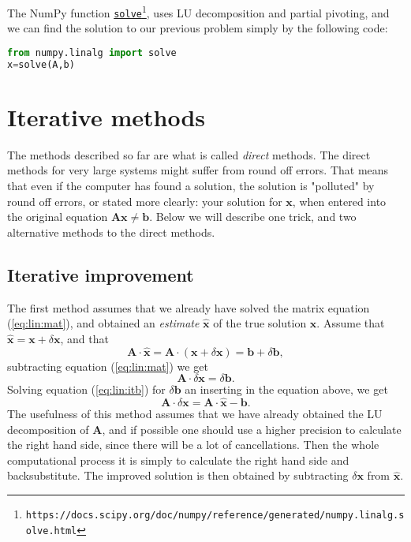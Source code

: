 \documentclass[graybox,sectrefs,envcountresetchap,open=right,final]{svmonodo}
\begin{document}
The NumPy function \href{{https://docs.scipy.org/doc/numpy/reference/generated/numpy.linalg.solve.html}}{\nolinkurl{solve}\footnote{\texttt{https://docs.scipy.org/doc/numpy/reference/generated/numpy.linalg.solve.html}}}, uses LU decomposition and partial pivoting, and we can find the solution to our previous problem simply by the following code:



\begin{lstlisting}[language=python,style=blue1]
from numpy.linalg import solve
x=solve(A,b)

\end{lstlisting}


\section{Iterative methods}
The methods described so far are what is called \emph{direct} methods. The direct methods for very large systems might suffer from round off errors. That means that even if the computer has found a solution, the solution is "polluted" by round off errors, or stated more clearly: your solution for $\mathbf{x}$, when entered into the original equation $\mathbf{A}\mathbf{x}\neq\mathbf{b}$. Below we will describe one trick, and two alternative methods to the direct methods.
\subsection{Iterative improvement}
The first method \cite{press2001} assumes that we already have solved the matrix equation (\ref{eq:lin:mat}), and obtained an \emph{estimate} $\mathbf{\hat{x}}$ of the true solution $\mathbf{x}$. Assume that $\mathbf{\hat{x}}=\mathbf{x}+\delta\mathbf{x}$, and that
\begin{equation}
\mathbf{A}\cdot\mathbf{\hat{x}}=\mathbf{A}\cdot(\mathbf{x}+\delta\mathbf{x})=\mathbf{b}+\delta\mathbf{b},
\label{eq:lin:itb}
\end{equation}
subtracting equation (\ref{eq:lin:mat}) we get
\begin{equation}
\mathbf{A}\cdot\delta\mathbf{x}=\delta\mathbf{b}.
\label{eq:lin:itb2}
\end{equation}
Solving equation (\ref{eq:lin:itb}) for $\delta\mathbf{b}$ an inserting in the equation above, we get
\begin{equation}
\mathbf{A}\cdot\delta\mathbf{x}=\mathbf{A}\cdot\mathbf{\hat{x}}-\mathbf{b}.
\label{eq:lin:itb3}
\end{equation}
The usefulness of this method assumes that we have already obtained the LU decomposition of $\mathbf{A}$, and if possible one should use a higher precision to calculate the right hand side, since there will be a lot of cancellations. Then the whole computational process it is simply to calculate the right hand side and backsubstitute. The improved solution is then obtained by subtracting $\delta\mathbf{x}$ from $\mathbf{\hat{x}}$.
\end{document}
